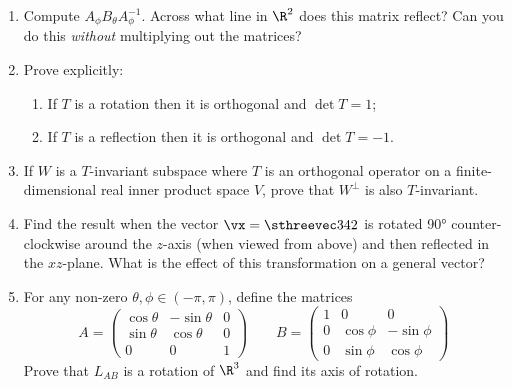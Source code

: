 \begin{exercises}
\begin{enumerate}[label=\thesubsection.\arabic*., align=right]
 	\item Compute $A_\phi B_\theta A_\phi^{-1}$. Across what line in $\R^2$ does this matrix reflect? Can you do this \emph{without} multiplying out the matrices?
  
  \item Prove explicitly:
  \begin{enumerate}
    \item If $T$ is a rotation then it is orthogonal and $\det T=1$;
    \item If $T$ is a reflection then it is orthogonal and $\det T=-1$.
  \end{enumerate}
  
  \item If $W$ is a $T$-invariant subspace where $T$ is an orthogonal operator on a finite-dimensional real inner product space $V$, prove that $W^\perp$ is also $T$-invariant.

	\item Find the result when the vector $\vx=\sthreevec 342$ is rotated \ang{90} counter-clockwise around the $z$-axis (when viewed from above) and then reflected in the $xz$-plane. What is the effect of this transformation on a general vector?
  
  \item For any non-zero $\theta,\phi\in(-\pi,\pi)$, define the matrices
  \[A=\begin{pmatrix}
  \cos\theta&-\sin\theta&0\\
  \sin\theta&\cos\theta&0\\
  0&0&1
  \end{pmatrix}\qquad B=\begin{pmatrix}
  1&0&0\\
  0&\cos\phi&-\sin\phi\\
  0&\sin\phi&\cos\phi
  \end{pmatrix}\]
  Prove that $L_{AB}$ is a rotation of $\R^3$ and find its axis of rotation.

 	
  

\end{enumerate}
\end{exercises}
